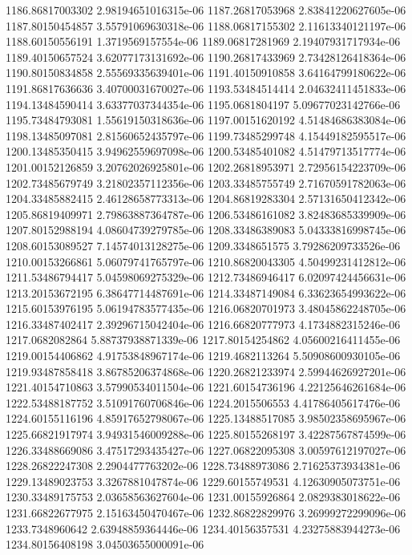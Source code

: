{1186.86817003302 2.98194651016315e-06
1187.26817053968 2.83841220627605e-06
1187.80150454857 3.55791069630318e-06
1188.06817155302 2.11613340121197e-06
1188.60150556191 1.3719569157554e-06
1189.06817281969 2.19407931717934e-06
1189.40150657524 3.62077173131692e-06
1190.26817433969 2.73428126418364e-06
1190.80150834858 2.55569335639401e-06
1191.40150910858 3.64164799180622e-06
1191.86817636636 3.40700031670027e-06
1193.53484514414 2.04632411451833e-06
1194.13484590414 3.63377037344354e-06
1195.0681804197 5.09677023142766e-06
1195.73484793081 1.55619150318636e-06
1197.00151620192 4.51484686383084e-06
1198.13485097081 2.81560652435797e-06
1199.73485299748 4.15449182595517e-06
1200.13485350415 3.94962559697098e-06
1200.53485401082 4.51479713517774e-06
1201.00152126859 3.20762026925801e-06
1202.26818953971 2.72956154223709e-06
1202.73485679749 3.21802357112356e-06
1203.33485755749 2.71670591782063e-06
1204.33485882415 2.46128658773313e-06
1204.86819283304 2.57131650412342e-06
1205.86819409971 2.79863887364787e-06
1206.53486161082 3.82483685339909e-06
1207.80152988194 4.08604739279785e-06
1208.33486389083 5.04333816998745e-06
1208.60153089527 7.14574013128275e-06
1209.3348651575 3.79286209733526e-06
1210.00153266861 5.06079741765797e-06
1210.86820043305 4.50499231412812e-06
1211.53486794417 5.04598069275329e-06
1212.73486946417 6.02097424456631e-06
1213.20153672195 6.38647714487691e-06
1214.33487149084 6.33623654993622e-06
1215.60153976195 5.06194783577435e-06
1216.06820701973 3.48045862248705e-06
1216.33487402417 2.39296715042404e-06
1216.66820777973 4.1734882315246e-06
1217.0682082864 5.88737938871339e-06
1217.80154254862 4.05600216411455e-06
1219.00154406862 4.91753848967174e-06
1219.4682113264 5.50908600930105e-06
1219.93487858418 3.86785206374868e-06
1220.26821233974 2.59944626927201e-06
1221.40154710863 3.57990534011504e-06
1221.60154736196 4.22125646261684e-06
1222.53488187752 3.51091760706846e-06
1224.2015506553 4.41786405617476e-06
1224.60155116196 4.85917652798067e-06
1225.13488517085 3.98502358695967e-06
1225.66821917974 3.94931546009288e-06
1225.80155268197 3.42287567874599e-06
1226.33488669086 3.47517293435427e-06
1227.06822095308 3.00597612197027e-06
1228.26822247308 2.2904477763202e-06
1228.73488973086 2.71625373934381e-06
1229.13489023753 3.3267881047874e-06
1229.60155749531 4.12630905073751e-06
1230.33489175753 2.03658563627604e-06
1231.00155926864 2.0829383018622e-06
1231.66822677975 2.15163450470467e-06
1232.86822829976 3.26999272299096e-06
1233.7348960642 2.63948859364446e-06
1234.40156357531 4.23275883944273e-06
1234.80156408198 3.04503655000091e-06
}
